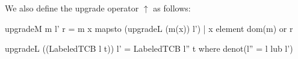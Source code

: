 We also define the upgrade operator $\uparrow$ as follows:
\begin{code}
  upgradeM m l' r = m { x mapsto (upgradeL (m(x)) l') | x element dom(m) or r}
\end{code}
\begin{code}
  upgradeL ((LabeledTCB l t)) l' = LabeledTCB l'' t where denot(l'' = l lub l')
\end{code}

